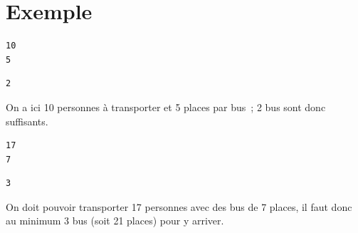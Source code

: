 \documentclass[12pt,a4paper]{report}
\begin{document}
\section*{Exemple}%
\begin{minipage}{\linewidth}

\begin{multicols}{2}
	\begin{tcolorbox}[title=Entrée,width=\linewidth,arc=0mm,colbacktitle={white!80!black},coltitle=black]
		\begin{verbatim}
10
5
		\end{verbatim}
	\end{tcolorbox}
\columnbreak
	\begin{tcolorbox}[title=Sortie,width=\linewidth,arc=0mm,colbacktitle={white!80!black},coltitle=black]
		\begin{verbatim}
2
        \end{verbatim}
	\end{tcolorbox}
\end{multicols}
On a ici 10 personnes à transporter et 5 places par bus~; 2 bus sont donc suffisants.


\begin{multicols}{2}
	\begin{tcolorbox}[title=Entrée,width=\linewidth,arc=0mm,colbacktitle={white!80!black},coltitle=black]
		\begin{verbatim}
17
7
		\end{verbatim}
	\end{tcolorbox}
\columnbreak
	\begin{tcolorbox}[title=Sortie,width=\linewidth,arc=0mm,colbacktitle={white!80!black},coltitle=black]
		\begin{verbatim}
3
        \end{verbatim}
	\end{tcolorbox}
\end{multicols}
On doit pouvoir transporter 17 personnes avec des bus de 7 places, il faut donc au minimum 3 bus (soit 21 places) pour y arriver.

\end{minipage}

\bigskip
\end{document}
